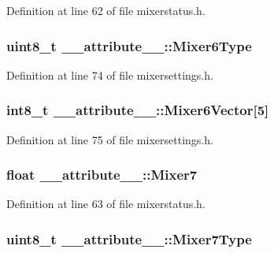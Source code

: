 \-Definition at line 62 of file mixerstatus.\-h.

\hypertarget{struct____attribute_____aedbde5b3db63a0f4317e6e28ef54fc53}{
\subsubsection[{\-Mixer6\-Type}]{\setlength{\rightskip}{0pt plus 5cm}uint8\-\_\-t {\bf \-\_\-\-\_\-attribute\-\_\-\-\_\-\-::\-Mixer6\-Type}}}\label{struct____attribute_____aedbde5b3db63a0f4317e6e28ef54fc53}


\-Definition at line 74 of file mixersettings.\-h.

\hypertarget{struct____attribute_____aedf2ecbcb1e92a554ea36b25f7ccdfa0}{
\subsubsection[{\-Mixer6\-Vector}]{\setlength{\rightskip}{0pt plus 5cm}int8\-\_\-t {\bf \-\_\-\-\_\-attribute\-\_\-\-\_\-\-::\-Mixer6\-Vector}\mbox{[}5\mbox{]}}}\label{struct____attribute_____aedf2ecbcb1e92a554ea36b25f7ccdfa0}


\-Definition at line 75 of file mixersettings.\-h.

\hypertarget{struct____attribute_____ae9bab814c00fc24a315af3cfb0b35410}{
\subsubsection[{\-Mixer7}]{\setlength{\rightskip}{0pt plus 5cm}float {\bf \-\_\-\-\_\-attribute\-\_\-\-\_\-\-::\-Mixer7}}}\label{struct____attribute_____ae9bab814c00fc24a315af3cfb0b35410}


\-Definition at line 63 of file mixerstatus.\-h.

\hypertarget{struct____attribute_____a16dccc1c36bf848904106e8717c9fe90}{
\subsubsection[{\-Mixer7\-Type}]{\setlength{\rightskip}{0pt plus 5cm}uint8\-\_\-t {\bf \-\_\-\-\_\-attribute\-\_\-\-\_\-\-::\-Mixer7\-Type}}}\label{struct____attribute_____a16dccc1c36bf848904106e8717c9fe90}



